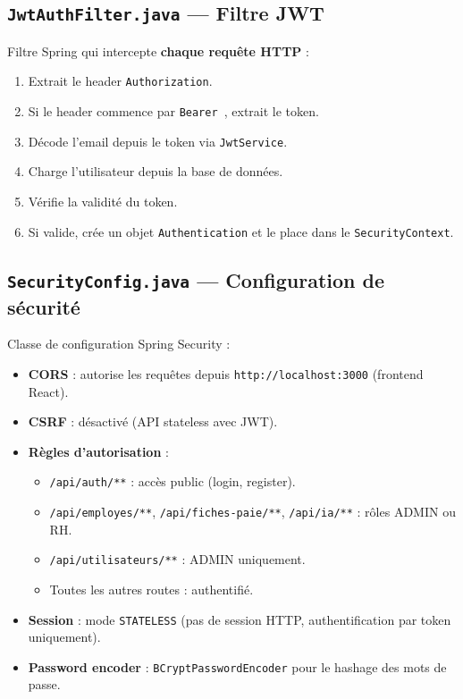 \documentclass[a4paper,12pt]{report}
\begin{document}
\subsection{\texttt{JwtAuthFilter.java} --- Filtre JWT}
Filtre Spring qui intercepte \textbf{chaque requête HTTP} :
\begin{enumerate}
  \item Extrait le header \texttt{Authorization}.
  \item Si le header commence par \texttt{Bearer }, extrait le token.
  \item Décode l'email depuis le token via \texttt{JwtService}.
  \item Charge l'utilisateur depuis la base de données.
  \item Vérifie la validité du token.
  \item Si valide, crée un objet \texttt{Authentication} et le place dans le \texttt{SecurityContext}.
\end{enumerate}

\subsection{\texttt{SecurityConfig.java} --- Configuration de sécurité}
Classe de configuration Spring Security :
\begin{itemize}
  \item \textbf{CORS} : autorise les requêtes depuis \texttt{http://localhost:3000} (frontend React).
  \item \textbf{CSRF} : désactivé (API stateless avec JWT).
  \item \textbf{Règles d'autorisation} :
  \begin{itemize}
    \item \texttt{/api/auth/**} : accès public (login, register).
    \item \texttt{/api/employes/**}, \texttt{/api/fiches-paie/**}, \texttt{/api/ia/**} : rôles ADMIN ou RH.
    \item \texttt{/api/utilisateurs/**} : ADMIN uniquement.
    \item Toutes les autres routes : authentifié.
  \end{itemize}
  \item \textbf{Session} : mode \texttt{STATELESS} (pas de session HTTP, authentification par token uniquement).
  \item \textbf{Password encoder} : \texttt{BCryptPasswordEncoder} pour le hashage des mots de passe.
\end{itemize}
\end{document}
